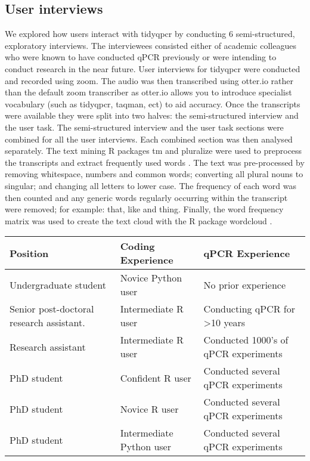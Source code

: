 \documentclass[../main.tex]{subfiles}
\begin{document}
\subsection{User interviews}
We explored how users interact with tidyqpcr by conducting 6 semi-structured, exploratory interviews. 
The interviewees consisted either of academic colleagues who were known to have conducted qPCR previously or were intending to conduct research in the near future.
User interviews for tidyqpcr were conducted and recorded using zoom.
The audio was then transcribed using otter.io rather than the default zoom transcriber as otter.io allows you to introduce specialist vocabulary (such as tidyqpcr, taqman, ect) to aid accuracy.
Once the transcripts were available they were split into two halves: the semi-structured interview and the user task.
The semi-structured interview and the user task sections were combined for all the user interviews.
Each combined section was then analysed separately. 
The text mining R packages tm and pluralize were used to preprocess the transcripts and extract frequently used words \parencite{Feinerer2008, Rudis2020}.
The text was pre-processed by removing whitespace, numbers and common words; converting all plural nouns to singular; and changing all letters to lower case.
The frequency of each word was then counted and any generic words regularly occurring within the transcript were removed; for example: that, like and thing.
Finally, the word frequency matrix was used to create the text cloud with the R package wordcloud \parencite{Fellows2018}.

\begin{center} 
\begingroup
\setlength{\tabcolsep}{5pt}
\begin{tabular}{|| m{4cm} | m{4.3cm} | m{4cm} ||}
 \hline
 \textbf{\large Position} & \textbf{\large Coding Experience} & \textbf{\large qPCR Experience} \\ [0.5ex] 
 \hline
 Undergraduate student & Novice Python user & No prior experience\\ 
 \hline
 Senior post-doctoral research assistant. & Intermediate R user & Conducting qPCR for >10 years \\
 \hline
 Research assistant & Intermediate R user & Conducted 1000's of qPCR experiments\\
 \hline
 PhD student & Confident R user & Conducted several qPCR experiments \\
 \hline
 PhD student & Novice R user & Conducted several qPCR experiments\\
 \hline
 PhD student & Intermediate Python user & Conducted several qPCR experiments\\
 \hline
\end{tabular}
 \endgroup
\end{center}
\end{document}

